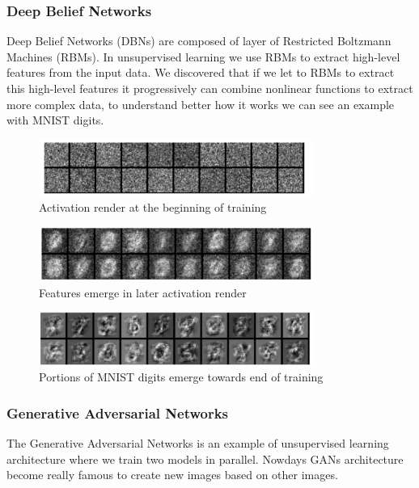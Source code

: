 \subsubsection[Deep Belief Networks]{Deep Belief Networks}
Deep Belief Networks (DBNs) are composed of layer of Restricted Boltzmann Machines (RBMs). In unsupervised learning we use RBMs to extract high-level features from the input data. We discovered that if we let to RBMs to extract this high-level features it progressively can combine nonlinear functions to extract more complex data, to understand better how it works we can see an example with MNIST digits.\cite{dp4j-deep-learning}


\begin{figure}[H]
\centering
\includegraphics[width=0.8\textwidth]{./figures/rbmm-1}
\caption{Activation render at the beginning of training \cite{dp4j-deep-learning}}
\end{figure}

\begin{figure}[H]
\centering
\includegraphics[width=0.8\textwidth]{./figures/rbmm-2}
\caption{Features emerge in later activation render \cite{dp4j-deep-learning}}
\end{figure}

\begin{figure}[H]
\centering
\includegraphics[width=0.8\textwidth]{./figures/rbmm-3}
\caption{Portions of MNIST digits emerge towards end of training \cite{dp4j-deep-learning}}
\end{figure}

\subsubsection[Generative Adversarial Networks]{Generative Adversarial Networks}
The Generative Adversarial Networks is an example of unsupervised learning architecture where we train two models in parallel. Nowdays GANs architecture become really famous to create new images based on other images\cite{dp4j-deep-learning}. 

